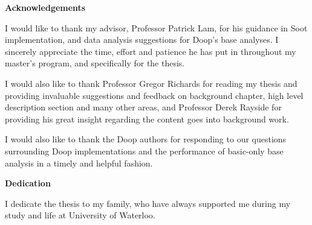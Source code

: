 \cleardoublepage


\begin{center}\textbf{Acknowledgements}\end{center}

I would like to thank my advisor, Professor Patrick Lam, for his guidance in Soot implementation, and data analysis suggestions for Doop's base analyses. I sincerely appreciate the time, effort and patience he has put in throughout my master's program, and specifically for the thesis.

I would also like to thank Professor Gregor Richards for reading my thesis and providing invaluable suggestions and feedback on background chapter, high level description section and many other areas, and Professor Derek Rayside for providing his great insight regarding the content goes into background work.

I would also like to thank the Doop authors for responding to our questions surrounding Doop implementations and the performance of basic-only base analysis in a timely and helpful fashion.

\cleardoublepage


\begin{center}\textbf{Dedication}\end{center}

I dedicate the thesis to my family, who have always supported me during my study and life at University of Waterloo.
\cleardoublepage

\renewcommand\contentsname{Table of Contents}
\tableofcontents
\cleardoublepage
{}    %

\listoffigures
\cleardoublepage
{}		%

\listoftables
\cleardoublepage
{}		%


